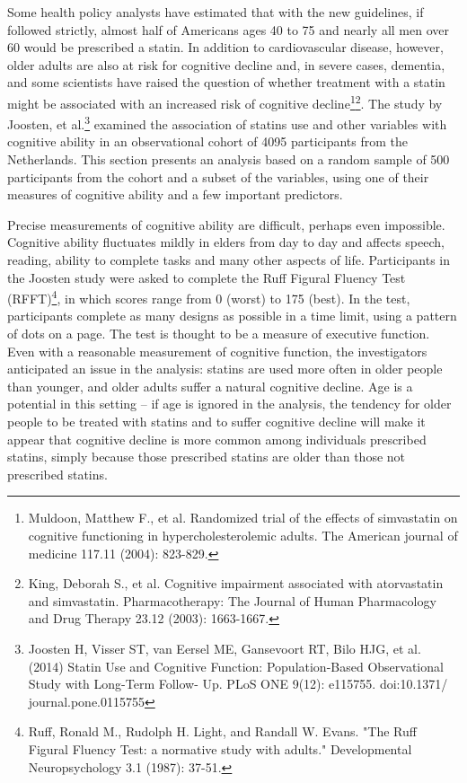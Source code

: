 Some health policy analysts have estimated that with the new guidelines, if followed strictly, almost half of Americans ages 40 to 75 and nearly all men over 60 would be prescribed a statin. In addition to cardiovascular disease, however, older adults are also at risk for cognitive decline and, in severe cases, dementia, and some scientists have raised the question of whether treatment with a statin might be associated with an increased risk of cognitive decline\footnote{Muldoon, Matthew F., et al. Randomized trial of the effects of simvastatin on cognitive functioning in hypercholesterolemic adults. The American journal of medicine 117.11 (2004): 823-829.}\footnote{King, Deborah S., et al. Cognitive impairment associated with atorvastatin and simvastatin. Pharmacotherapy: The Journal of Human Pharmacology and Drug Therapy 23.12 (2003): 1663-1667.}.  The study by Joosten, et al.\footnote{Joosten H, Visser ST, van Eersel ME, Gansevoort RT, Bilo HJG, et al. (2014) Statin Use and Cognitive Function: Population-Based Observational Study with Long-Term Follow- Up. PLoS ONE 9(12): e115755. doi:10.1371/ journal.pone.0115755} examined the association of statins use and other variables with cognitive ability in an observational cohort of 4095 participants from the Netherlands.  This section presents an analysis based on a random sample of 500 participants from the cohort and a subset of the variables, using one of their measures of cognitive ability and a few important predictors.

 
Precise measurements of cognitive ability are difficult, perhaps even impossible.  Cognitive ability fluctuates mildly in elders from day to day and affects speech, reading, ability to complete tasks and many other aspects of life.  Participants in the Joosten study were asked to complete the Ruff Figural Fluency Test (RFFT)\footnote{Ruff, Ronald M., Rudolph H. Light, and Randall W. Evans. "The Ruff Figural Fluency Test: a normative study with adults." Developmental Neuropsychology 3.1 (1987): 37-51.}, in which scores range from 0 (worst) to 175 (best).  In the test, participants complete as many designs as possible in a time limit, using a pattern of dots on a page.  The test is thought to be a measure of executive function.  Even with a reasonable measurement of cognitive function, the investigators anticipated an issue in the analysis: statins are used more often in older people than younger, and older adults suffer a natural cognitive decline.  Age is a potential  in this setting -- if age is ignored in the analysis, the tendency for older people to be treated with statins and to suffer cognitive decline  will make it appear that cognitive decline is more common among individuals prescribed statins, simply because those prescribed statins are older than those not prescribed statins.

